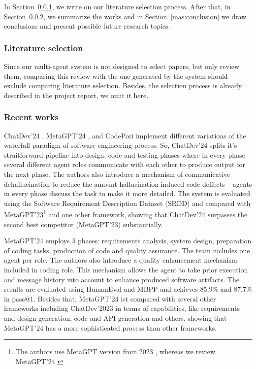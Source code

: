 In Section~\ref{mas:literature}, we write on our literature selection process. After that, in Section~\ref{mas:contributions}, we summarize the works and in Section~\ref{mas:conclusion} we draw conclusions and present possible future research topics.

\subsubsection{Literature selection}
\label{mas:literature}

Since our multi-agent system is not designed to select papers, but only review them, comparing this review with the one generated by the system should exclude comparing literature selection. Besides, the selection process is already described in the project report, we omit it here.

\subsubsection{Recent works}
\label{mas:contributions}


ChatDev'24 \cite{qian2024chatdevcommunicativeagentssoftware}, MetaGPT'24 \cite{hong2024metagptmetaprogrammingmultiagent}, and CodePori \cite{rasheed2024codeporilargescaleautonomoussoftware} implement different variations of the waterfall paradigm of software engineering process. So, ChatDev'24 splits it's straitforward pipeline into design, code and testing phases where in every phase several different agent roles communicate with each other to produce output for the next phase. The authors also introduce a mechanism of communicative dehallucination to reduce the amount hallucination-induced code deffects -- agents in every phase discuss the task to make it more detailed. The system is evaluated using the Software Requirement Description Dataset (SRDD)\cite{srdd} and compared with MetaGPT'23\footnote{The authors use MetaGPT version from 2023 \cite{metagpt23}, whereas we review MetaGPT'24 \cite{metagpt2024}} and one other framework, showing that ChatDev'24 surpasses the second best competitor (MetaGPT'23) substantially.

MetaGPT'24 \cite{hong2024metagptmetaprogrammingmultiagent} employs 5 phases: requirements analysis, system design, preparation of coding tasks, production of code and quality assurance. The team includes one agent per role. The authors also introduce a quality enhancement mechanism included in coding role. This mechanism allows the agent to take prior execution and message history into account to enhance produced software artifacts. The results are evaluated using HumanEval \cite{humaneval} and MBPP \cite{Cohan_2018} and achieves 85,9\% and 87,7\% in pass@1. Besides that, MetaGPT'24 ist compared with several other frameworks including ChatDev'2023 \cite{chatdev2023} in terms of capabilities,  like requirements and design generation, code and API generation and others, showing that MetaGPT'24 has a more sophisticated process than other frameworks.

